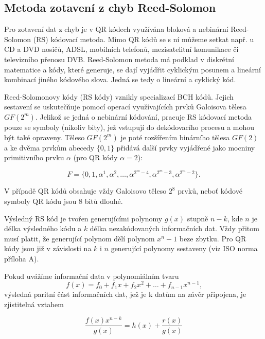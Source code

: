 \subsection{Metoda zotavení z chyb Reed-Solomon}
\label{metodaReedSolomon}

Pro zotavení dat z chyb je v QR kódech využívána bloková a nebinární
Reed-Solomon (RS) kódovací metoda. Mimo QR kódů se s ní můžeme setkat např. u 
 CD a DVD nosičů, ADSL, mobilních telefonů, mezisatelitní komunikace či 
televizního přenosu DVB. Reed-Solomon metoda má podklad v diskrétní matematice 
a kódy, které generuje, se dají vyjádřit cyklickým posunem a lineární kombinací
jiného kódového slova. Jedná se tedy o lineární a cyklický kód.

Reed-Solomonovy kódy (RS kódy) vznikly specializací BCH kódů. Jejich sestavení
se uskutečňuje pomocí operací využívajících prvků Galoisova tělesa $GF(2^m)$. 
Jelikož se jedná o nebinární kódování, pracuje RS kódovací metoda pouze se 
symboly (nikoliv bity), jež vstupují do dekódovacího procesu a mohou být také 
opraveny. Těleso $GF(2^m)$ je poté rozšířením binárního tělesa $GF(2)$ a ke
dvěma prvkům abecedy $\{0,1\}$ přidává další prvky vyjádřené jako mocniny
primitivního prvku $\alpha$ (pro QR kódy $\alpha = 2$): 

\begin{equation}
  F = \{ 0, 1, \alpha^1, \alpha^2, \ldots, \alpha^{2^{m}-4}, \alpha^{2^{m}-3},
  \alpha^{2^{m}-2}\}\mbox{.}
\end{equation}

\noindent V případě QR kódů obsahuje vždy Galoisovo těleso $2^8$ prvků, neboť
kódové symboly QR kódu jsou 8 bitů dlouhé. \cite{sklarRSCodes}

Výsledný RS kód je tvořen generujícími polynomy 
$g(x)$ stupně $n-k$, kde $n$ je délka výsledného kódu a $k$ délka nezakódovaných 
informačních dat. Vždy přitom musí platit, že generující polynom dělí polynom 
$x^n-1$ beze zbytku. Pro QR kódy jsou již v závislosti na $k$ i $n$ generující 
polynomy sestaveny (viz ISO norma příloha A).

Pokud uvážíme informační data v polynomiálním tvaru
\begin{equation}
  f(x) = f_{0} + f_{1}x + f_{2}x^2 + \ldots + f_{n-1}x^{n-1}\mbox{,}
\end{equation}
\noindent výsledná paritní část informačních dat, jež je k datům na závěr
připojena, je zjistitelná vztahem

\begin{equation}
  \frac{f(x) x^{n-k}}{g(x)} = h(x) + \frac{r(x)}{g(x)}
\end{equation}

